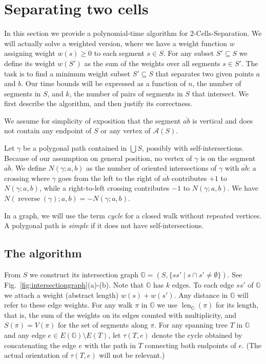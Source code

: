 \documentclass[11pt,a4paper]{article}
\def\A{\ensuremath{\mathcal{A}}}
\def\I{\ensuremath{\mathbb{G}}}
\def\cycle{\ensuremath{\tau}}
\newcommand\segment[1]{\ensuremath{\overline{#1}}}
\DeclareMathOperator{\lengthBIS}{len}
\newcommand\length{\lengthBIS_{\I}}
\DeclareMathOperator{\reverse}{reverse}
\begin{document}
\section{Separating two cells}

In this section we provide a polynomial-time algorithm for {\sc $2$-Cells-Separation}.
We will actually solve a weighted version, where we have a weight function $w$ assigning 
weight $w(s)\ge 0$ to each segment $s\in S$. For any subset $S'\subseteq S$ we define its weight
$w(S')$ as the sum of the weights over all segments $s\in S'$. 
The task is to find a minimum weight subset $S'\subseteq S$ that separates two given points $a$ and $b$.
Our time bounds will be expressed as a function of $n$, the number of segments in $S$,
and $k$, the number of pairs of segments in $S$ that intersect.
We first describe the algorithm, and then justify its correctness.

We assume for simplicity of exposition that the segment $\segment{ab}$ is vertical
and does not contain any endpoint of $S$ or any vertex of $\A(S)$.

Let $\gamma$ be a polygonal path contained in $\bigcup S$, possibly with self-intersections.
Because of our assumption on general position, no vertex
of $\gamma$ is on the segment $\segment{ab}$.
We define $N(\gamma;a,b)$ as the number of oriented intersections
of $\gamma$ with $\segment{ab}$: a crossing where $\gamma$ goes from the left to the right of $\segment{ab}$
contributes $+1$ to $N(\gamma;a,b)$,
while a right-to-left crossing contributes $-1$ to $N(\gamma;a,b)$.
We have $N(\reverse (\gamma);a,b)= -N(\gamma;a,b)$.

In a graph, we will use the term \emph{cycle} for a closed walk without repeated vertices.
A polygonal path is \emph{simple} if it does not have self-intersections.

\subsection{The algorithm}
\label{sec:algorithm}

From $S$ we construct its intersection graph 
$\I=(S,\{ ss'\mid s\cap s'\not = \emptyset \})$.
See Fig.~\ref{fig:intersectiongraph}(a)-(b). 
Note that $\I$ has $k$ edges.
To each edge $ss'$ of $\I$ we attach a weight (abstract length) $w(s)+w(s')$.
Any distance in $\I$ will refer to these edge weights.
For any walk $\pi$ in $\I$ we use $\length (\pi)$ for its length, that is, the sum of the weights on its edges
counted with multiplicity, and $S(\pi)=V(\pi)$ for the set of segments along $\pi$.
For any spanning tree $T$ in $\I$ and any edge $e\in E(\I)\setminus E(T)$,
let $\cycle(T,e)$ denote the cycle obtained by concatenating the edge $e$ with 
the path in $T$ connecting both endpoints of $e$. 
(The actual orientation of $\cycle(T,e)$ will not be relevant.)
\end{document}
